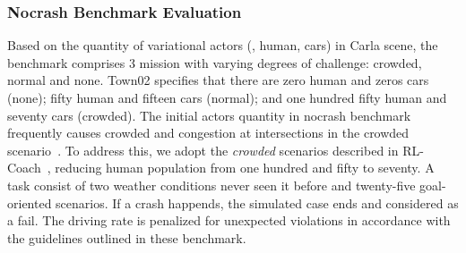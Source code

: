 \begin{table}
	\caption{Town05 outcomes based on offline measurements.
		Carla is used to evaluate all methods.
		3 experiment with various random seeds are used to calculate the mean values and standard deviations.
		Better performance is indicated by higher values for metrics marked with $\uparrow$, while lower are perferred for those marked with $\downarrow$.}
	\centering
	\label{tab:T5_results}
\end{table}

\subsubsection{Nocrash Benchmark Evaluation}\label{nocrash_metrics}

\hspace{1pc}Based on the quantity of variational actors ({\ie}, human, cars) in Carla scene, the benchmark comprises 3 mission with varying degrees of challenge: crowded, normal and none.
Town02 specifies that there are zero human and zeros cars (none); fifty human and fifteen cars (normal); and one hundred fifty human and seventy cars (crowded).
%
The initial actors quantity in nocrash benchmark frequently causes crowded and congestion at intersections in the crowded scenario~\cite{Zhang:2021}.
To address this, we adopt the \emph{crowded} scenarios described in RL-Coach~\cite{Zhang:2021}, reducing human population from one hundred and fifty to seventy. 
A task consist of two weather conditions never seen it before and twenty-five goal-oriented scenarios.
If a crash happends, the simulated case ends and considered as a fail.
The driving rate is penalized for unexpected violations in accordance with the guidelines outlined in these benchmark.



